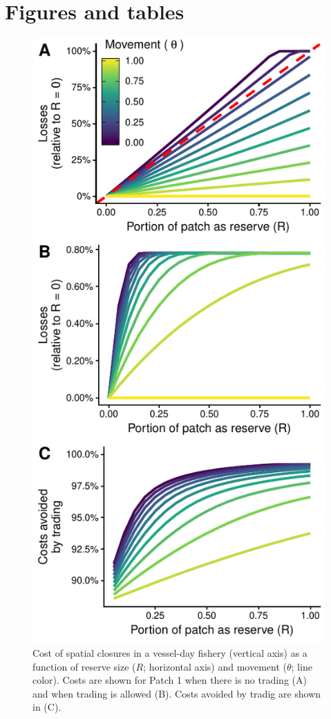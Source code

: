 \documentclass[12pt]{article}
\begin{document}
\section*{Figures and tables}

\begin{figure}[htbp]
\centering
\includegraphics{img/PNA_model.pdf}
\caption{\label{fig:PNA_model}Cost of spatial closures in a vessel-day fishery (vertical axis) as a function of reserve size ($R$; horizontal axis) and movement ($\theta$; line color). Costs are shown for Patch 1 when there is no trading (A) and when trading is allowed (B). Costs avoided by tradig are shown in (C).}
\end{figure}
\end{document}
